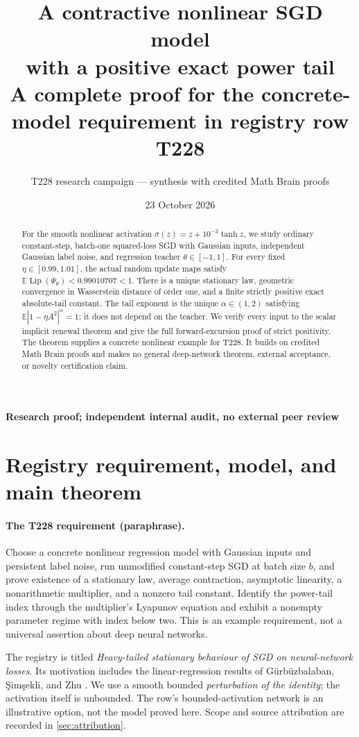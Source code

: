 \documentclass[11pt,a4paper]{article}
\title{\vspace{-1.4em}\textbf{A contractive nonlinear SGD model\\with a positive exact power tail}\\[0.55em]
  \large A complete proof for the concrete-model requirement in registry row T228}
\author{\normalsize T228 research campaign --- synthesis with credited Math Brain proofs}
\date{23 October 2026}
\numberwithin{equation}{section}
\theoremstyle{remark}
\DeclareMathOperator{\Lip}{Lip}
\newcommand{\E}{\mathbb E}
\begin{document}
\maketitle
\thispagestyle{plain}
\begin{center}
\small\textbf{Research proof; independent internal audit, no external peer review}
\end{center}

\begin{abstract}
For the smooth nonlinear activation $\sigma(z)=z+10^{-3}\tanh z$, we study
ordinary constant-step, batch-one squared-loss SGD with Gaussian inputs,
independent Gaussian label noise, and regression teacher $\theta\in[-1,1]$.
For every fixed $\eta\in[0.99,1.01]$, the actual random update maps satisfy
$\E\Lip(\Psi_\theta)<0.99010707<1$. There is a unique stationary law,
geometric convergence in Wasserstein distance of order one, and a finite
strictly positive exact absolute-tail constant. The tail exponent is the
unique $\alpha\in(1,2)$ satisfying $\E|1-\eta A^2|^\alpha=1$; it does not
depend on the teacher. We verify every input to the scalar implicit renewal
theorem and give the full forward-excursion proof of strict positivity.
The theorem supplies a concrete nonlinear example for T228. It builds on
credited Math Brain proofs and makes no general deep-network theorem,
external acceptance, or novelty certification claim.
\end{abstract}

\section{Registry requirement, model, and main theorem}
\label{sec:main}

\paragraph{The T228 requirement (paraphrase).}
Choose a concrete nonlinear regression model with Gaussian inputs and
persistent label noise, run unmodified constant-step SGD at batch size $b$,
and prove existence of a stationary law, average contraction, asymptotic
linearity, a nonarithmetic multiplier, and a nonzero tail constant. Identify
the power-tail index through the multiplier's Lyapunov equation and exhibit
a nonempty parameter regime with index below two. This is an example
requirement, not a universal assertion about deep neural networks.

The registry is titled \emph{Heavy-tailed stationary behaviour of SGD on
neural-network losses}. Its motivation includes the linear-regression
results of G\"urb\"uzbalaban, \c{S}im\c{s}ekli, and Zhu
\cite{Gurbuzbalaban2021}. We use a smooth bounded \emph{perturbation of the
identity}; the activation itself is unbounded. The row's bounded-activation
network is an illustrative option, not the model proved here. Scope and
source attribution are recorded in \cref{sec:attribution}.
\end{document}

